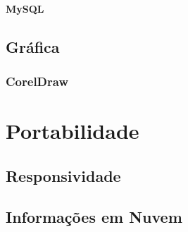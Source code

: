\documentclass[12pt,a4paper]{book}
\begin{document}
\subsubsection{MySQL}

\section{Gráfica}
\subsection{CorelDraw}


\chapter{Portabilidade}

\section{Responsividade}


\section{Informações em Nuvem}






\printindex
\end{document}
